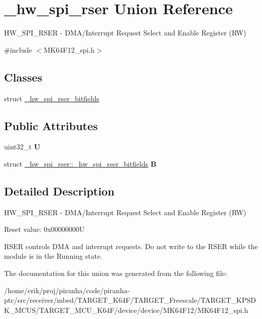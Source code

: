 \hypertarget{union__hw__spi__rser}{}\section{\+\_\+hw\+\_\+spi\+\_\+rser Union Reference}
\label{union__hw__spi__rser}


H\+W\+\_\+\+S\+P\+I\+\_\+\+R\+S\+ER -\/ D\+M\+A/\+Interrupt Request Select and Enable Register (RW)  




{\ttfamily \#include $<$M\+K64\+F12\+\_\+spi.\+h$>$}

\subsection*{Classes}
\begin{DoxyCompactItemize}
\item 
struct \hyperlink{struct__hw__spi__rser_1_1__hw__spi__rser__bitfields}{\+\_\+hw\+\_\+spi\+\_\+rser\+\_\+bitfields}
\end{DoxyCompactItemize}
\subsection*{Public Attributes}
\begin{DoxyCompactItemize}
\item 
uint32\+\_\+t {\bfseries U}\hypertarget{union__hw__spi__rser_a1fca786261b8c516025e11842da6eb13}{}\label{union__hw__spi__rser_a1fca786261b8c516025e11842da6eb13}

\item 
struct \hyperlink{struct__hw__spi__rser_1_1__hw__spi__rser__bitfields}{\+\_\+hw\+\_\+spi\+\_\+rser\+::\+\_\+hw\+\_\+spi\+\_\+rser\+\_\+bitfields} {\bfseries B}\hypertarget{union__hw__spi__rser_a6ce07c0ba603a110495b6b7bac5c63f1}{}\label{union__hw__spi__rser_a6ce07c0ba603a110495b6b7bac5c63f1}

\end{DoxyCompactItemize}


\subsection{Detailed Description}
H\+W\+\_\+\+S\+P\+I\+\_\+\+R\+S\+ER -\/ D\+M\+A/\+Interrupt Request Select and Enable Register (RW) 

Reset value\+: 0x00000000U

R\+S\+ER controls D\+MA and interrupt requests. Do not write to the R\+S\+ER while the module is in the Running state. 

The documentation for this union was generated from the following file\+:\begin{DoxyCompactItemize}
\item 
/home/erik/proj/piranha/code/piranha-\/ptc/src/receiver/mbed/\+T\+A\+R\+G\+E\+T\+\_\+\+K64\+F/\+T\+A\+R\+G\+E\+T\+\_\+\+Freescale/\+T\+A\+R\+G\+E\+T\+\_\+\+K\+P\+S\+D\+K\+\_\+\+M\+C\+U\+S/\+T\+A\+R\+G\+E\+T\+\_\+\+M\+C\+U\+\_\+\+K64\+F/device/device/\+M\+K64\+F12/M\+K64\+F12\+\_\+spi.\+h\end{DoxyCompactItemize}
